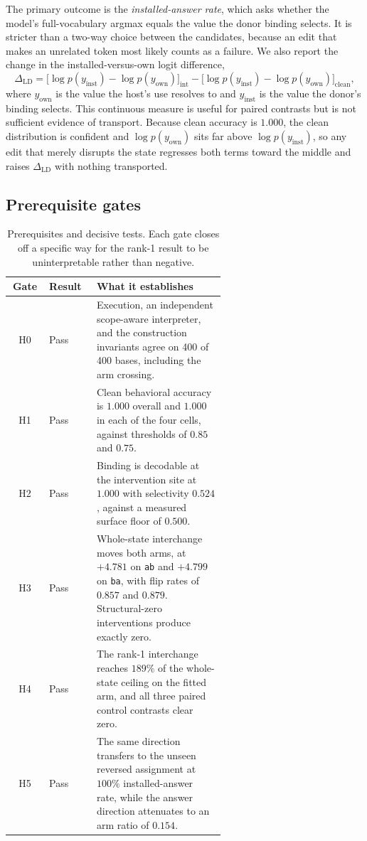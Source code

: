 \documentclass{article}
\begin{document}
The primary outcome is the \emph{installed-answer rate}, which asks whether the model's full-vocabulary argmax equals the value the donor binding selects. It is stricter than a two-way choice between the candidates, because an edit that makes an unrelated token most likely counts as a failure. We also report the change in the installed-versus-own logit difference,
\begin{equation}
\Delta_{\mathrm{LD}}=
\big[\log p(y_{\mathrm{inst}})-\log p(y_{\mathrm{own}})\big]_{\mathrm{int}}
-\big[\log p(y_{\mathrm{inst}})-\log p(y_{\mathrm{own}})\big]_{\mathrm{clean}},
\label{eq:delta-ld}
\end{equation}
where $y_{\mathrm{own}}$ is the value the host's use resolves to and $y_{\mathrm{inst}}$ is the value the donor's binding selects. This continuous measure is useful for paired contrasts but is not sufficient evidence of transport. Because clean accuracy is $1.000$, the clean distribution is confident and $\log p(y_{\mathrm{own}})$ sits far above $\log p(y_{\mathrm{inst}})$, so any edit that merely disrupts the state regresses both terms toward the middle and raises $\Delta_{\mathrm{LD}}$ with nothing transported.

\subsection{Prerequisite gates}

\begin{table}[htbp]
\centering
\small
\caption{Prerequisites and decisive tests. Each gate closes off a specific way for the rank-1 result to be uninterpretable rather than negative.}
\label{tab:app-gates}
\begin{tabular}{clp{0.60\linewidth}}
\toprule
Gate & Result & What it establishes \\
\midrule
H0 & Pass & Execution, an independent scope-aware interpreter, and the construction invariants agree on 400 of 400 bases, including the arm crossing. \\
H1 & Pass & Clean behavioral accuracy is $1.000$ overall and $1.000$ in each of the four cells, against thresholds of $0.85$ and $0.75$. \\
H2 & Pass & Binding is decodable at the intervention site at $1.000$ with selectivity $0.524$, against a measured surface floor of $0.500$. \\
H3 & Pass & Whole-state interchange moves both arms, at $+4.781$ on \texttt{ab} and $+4.799$ on \texttt{ba}, with flip rates of $0.857$ and $0.879$. Structural-zero interventions produce exactly zero. \\
H4 & Pass & The rank-1 interchange reaches $189\%$ of the whole-state ceiling on the fitted arm, and all three paired control contrasts clear zero. \\
H5 & Pass & The same direction transfers to the unseen reversed assignment at $100\%$ installed-answer rate, while the answer direction attenuates to an arm ratio of $0.154$. \\
\bottomrule
\end{tabular}
\end{table}
\end{document}
